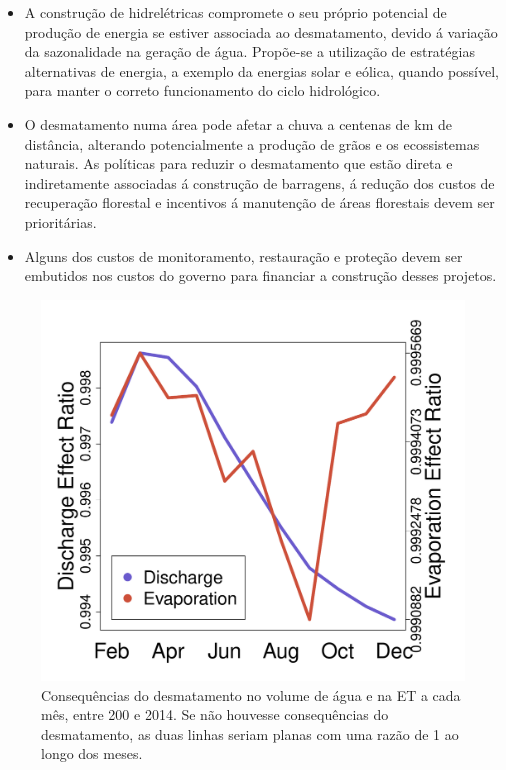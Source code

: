 \documentclass[DIV=calc, paper=a4, fontsize=11pt,twocolumn,margin=.5in]{scrartcl}	 %
\begin{document}
\renewcommand{\labelitemi}{${\color{DarkGoldenrod}\bullet}$}
\begin{itemize}	
\item A constru\c c\~{a}o de hidrel\'etricas compromete o seu pr\'oprio potencial de produ\c c\~{a}o de energia se estiver associada ao desmatamento, devido \'a varia\c c\~{a}o da sazonalidade na gera\c c\~{a}o de \'agua. Prop\~oe-se a utiliza\c c\~{a}o de estrat\'egias alternativas de energia, a exemplo da energias solar e e\'olica, quando poss\'ivel, para manter o correto funcionamento do ciclo hidrol\'ogico.
\item O desmatamento numa \'area pode afetar a chuva a centenas de km de dist\^{a}ncia, alterando potencialmente a produ\c c\~{a}o de gr\~aos e os ecossistemas naturais. As pol\'iticas
para reduzir o desmatamento que est\~ao direta e indiretamente associadas \'a constru\c c\~{a}o de barragens, \'a redu\c c\~{a}o dos custos de recupera\c c\~{a}o florestal e incentivos \'a manuten\c c\~{a}o de \'areas florestais devem ser priorit\'arias.
\item Alguns dos custos de monitoramento, restaura\c c\~{a}o e prote\c c\~{a}o devem ser embutidos nos custos do governo para financiar a constru\c c\~{a}o desses projetos.
\end{itemize}


\begin{figure}[h]
\vspace{-3.5em}
  \includegraphics[width=1\linewidth]{SeasonalEffects.pdf}
\vspace{-2em}
 \caption{Consequ\^encias do desmatamento no volume de \'agua e na ET a cada m\^es, entre 200 e 2014. Se n\~ao houvesse consequ\^encias do desmatamento, as duas linhas seriam planas com uma raz\~ao de 1 ao longo dos meses. }
  \label{fig:deforest}
\vspace{-2em}
\end{figure}
\end{document}

